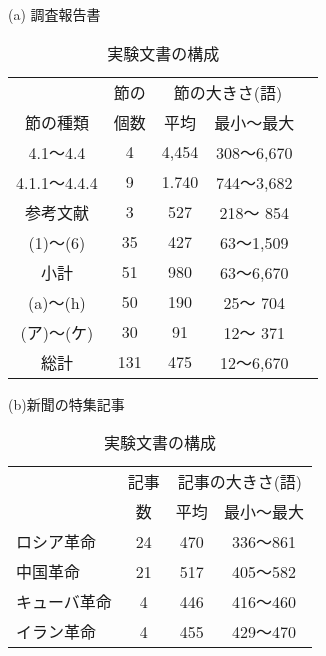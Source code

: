 \begin{table}[htbp]\footnotesize
  \begin{minipage}[b]{6.5cm}
  \begin{center}
    \leavevmode
    \caption{実験文書の構成}
    \label{tab:実験文書の構成}
    (a) 調査報告書\par
    \begin{tabular}{|c|c|c|c|c|}
      \hline
      & 節の & \multicolumn{2}{|c|}{節の大きさ(語)} \\
      \cline{3-4}
      節の種類 & 個数 & 平均 &  最小〜最大  \\ 
      \hline      
      4.1〜4.4     & 4  & 4,454 &   308〜6,670  \\ 
      4.1.1〜4.4.4 & 9  & 1.740 &   744〜3,682  \\ 
      参考文献     & 3  &   527 &   218〜  854  \\ 
      (1)〜(6)     & 35 &   427 &    63〜1,509  \\ 
      \hline      
        小計       & 51 &   980 &    63〜6,670  \\ 
      \hline      
      (a)〜(h)     & 50 &   190 &    25〜  704  \\ 
      (ア)〜(ケ)   & 30 &    91 &    12〜  371  \\ 
      \hline      
      \hline      
        総計       &131 &   475 &    12〜6,670  \\ 
      \hline      
    \end{tabular}
  \end{center}
  \begin{center}
    {(b)新聞の特集記事}\par
    \leavevmode
    \begin{tabular}{|l|c|c|c|}
      \hline
                   & 記事 & \multicolumn{2}{c|}{記事の大きさ(語)} \\
                   \cline{3-4}
                   & 数 & 平均 & 最小〜最大  \\%
      \hline   
      ロシア革命    & 24  &  470 &   336〜861 \\%
      中国革命      & 21  &  517 &   405〜582 \\%
      キューバ革命  &  4  &  446 &   416〜460 \\%
      イラン革命    &  4  &  455 &   429〜470 \\%

\end{tabular}
\end{center}
\end{minipage}
\end{table}
